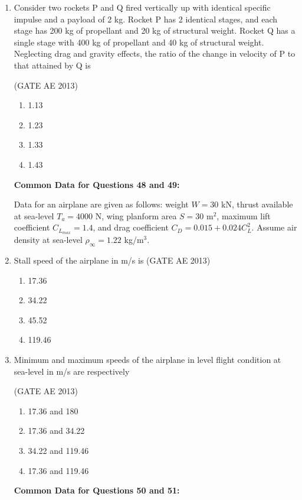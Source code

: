 \documentclass[journal,12pt,onecolumn]{IEEEtran}
\theoremstyle{remark}
\begin{document}
\begin{flushleft}
\begin{enumerate}
\item Consider two rockets P and Q fired vertically up with identical specific impulse and a payload of 2 kg. Rocket P has 2 identical stages, and each stage has 200 kg of propellant and 20 kg of structural weight. Rocket Q has a single stage with 400 kg of propellant and 40 kg of structural weight. Neglecting drag and gravity effects, the ratio of the change in velocity of P to that attained by Q is 

\hfill(GATE AE 2013)
\begin{multicols}{2}
\begin{enumerate}
\item 1.13
\item 1.23
\item 1.33
\item 1.43
\end{enumerate}
\end{multicols}
\textbf{Common Data for Questions 48 and 49:}

Data for an airplane are given as follows: weight $W=30$ kN, thrust available at sea-level $T_a=4000$ N, wing planform area $S=30$ m$^2$, maximum lift coefficient $C_{L_{max}}=1.4$, and drag coefficient $C_D=0.015+0.024C_L^2$. Assume air density at sea-level $\rho_\infty=1.22$ kg/m$^3$. 
\item Stall speed of the airplane in m/s is \hfill(GATE AE 2013)
\begin{multicols}{2}
\begin{enumerate}
\item 17.36
\item 34.22
\item 45.52
\item 119.46
\end{enumerate}
\end{multicols}

\item Minimum and maximum speeds of the airplane in level flight condition at sea-level in m/s are respectively 

\hfill(GATE AE 2013)
\begin{multicols}{2}
\begin{enumerate}
\item 17.36 and 180
\item 17.36 and 34.22
\item 34.22 and 119.46
\item 17.36 and 119.46
\end{enumerate}
\end{multicols}
\textbf{Common Data for Questions 50 and 51:} 


\end{enumerate}
\end{flushleft}
\end{document}
